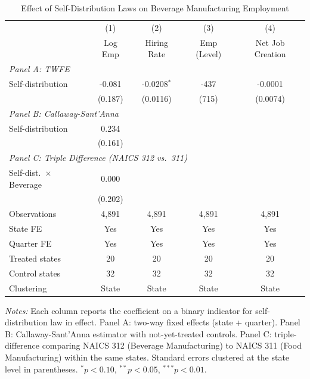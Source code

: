 \begin{table}[t]
\centering
\caption{Effect of Self-Distribution Laws on Beverage Manufacturing Employment}
\label{tab:main}
\begin{threeparttable}
\begin{tabular}{lcccc}
\toprule
 & (1) & (2) & (3) & (4) \\
 & Log Emp & Hiring Rate & Emp (Level) & Net Job Creation \\
\midrule
\multicolumn{5}{l}{\textit{Panel A: TWFE}} \\[4pt]
Self-distribution & -0.081 & -0.0208$^{*}$ & -437 & -0.0001 \\
 & (0.187) & (0.0116) & (715) & (0.0074) \\[8pt]
\multicolumn{5}{l}{\textit{Panel B: Callaway-Sant'Anna}} \\[4pt]
Self-distribution & 0.234 & & & \\
 & (0.161) & & & \\[8pt]
\multicolumn{5}{l}{\textit{Panel C: Triple Difference (NAICS 312 vs.\ 311)}} \\[4pt]
Self-dist.\ $\times$ Beverage & 0.000 & & & \\
 & (0.202) & & & \\[4pt]
\midrule
Observations & 4,891 & 4,891 & 4,891 & 4,891 \\
State FE & Yes & Yes & Yes & Yes \\
Quarter FE & Yes & Yes & Yes & Yes \\
Treated states & 20 & 20 & 20 & 20 \\
Control states & 32 & 32 & 32 & 32 \\
Clustering & State & State & State & State \\
\bottomrule
\end{tabular}
\begin{tablenotes}[flushleft]\small
\item \textit{Notes:} Each column reports the coefficient on a binary indicator for
self-distribution law in effect. Panel A: two-way fixed effects (state + quarter).
Panel B: Callaway-Sant'Anna estimator with not-yet-treated controls.
Panel C: triple-difference comparing NAICS 312 (Beverage Manufacturing) to NAICS 311
(Food Manufacturing) within the same states. Standard errors clustered at the state level
in parentheses. $^{*}p<0.10$, $^{**}p<0.05$, $^{***}p<0.01$.
\end{tablenotes}
\end{threeparttable}
\end{table}
